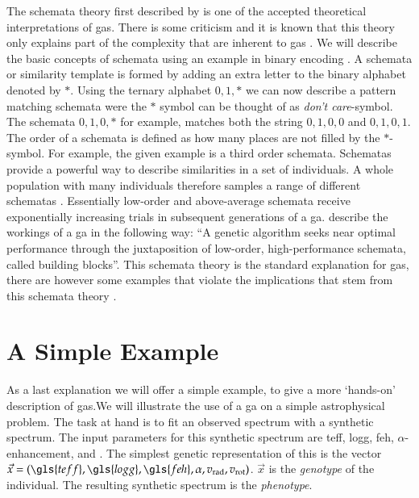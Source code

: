 The schemata theory first described by \cite{holland1975} is one of the accepted theoretical interpretations of \glspl{ga}. There is some criticism and it is known that this theory only explains part of the complexity that are inherent to \glspl{ga} \citep[see ][ and references therein]{Whitley94agenetic}. We will describe the basic concepts of schemata using an example in binary encoding \citep[notation adapted from ][]{citeulike:125978}. A schemata or similarity template is formed by adding an extra letter to the binary alphabet denoted by $*$. Using the ternary alphabet ${0, 1, *}$ we can now describe a pattern matching schemata were the $*$ symbol can be thought of as \textit{don't care}-symbol. The schemata ${0, 1, 0, *}$ for example, matches both the string ${0, 1, 0, 0}$ and ${0, 1, 0, 1}$. The order of a schemata is defined as how many places are not filled by the $*$-symbol. For example, the given example is a third order schemata. Schematas provide a powerful way to describe similarities in a set of \glspl{individual}. 
A whole population with many \glspl{individual} therefore samples a range of different schematas . Essentially low-order and above-average schemata receive exponentially increasing trials in subsequent generations of a \gls{ga}. \citet{Michalewicz:1994:GAD:184675} describe the workings of a \gls{ga} in the following way: ``A genetic algorithm seeks near optimal performance through the juxtaposition of low-order, high-performance schemata, called building blocks''.
This schemata theory is the standard explanation for \glspl{ga}, there are however some examples that violate the implications that stem from this schemata theory \citep[see chapter 3 of][for some examples]{Michalewicz:1994:GAD:184675}.

\section{A Simple Example}

As a last explanation we will offer a simple example, to give a more `hands-on' description of \glspl{ga}.We will illustrate the use of a \gls{ga} on a simple astrophysical problem. The task at hand is to fit an observed spectrum with a synthetic spectrum. The input parameters for this synthetic spectrum are \gls{teff}, \gls{logg}, \gls{feh}, $\alpha$-enhancement, \vrad and \vrot. The simplest genetic representation of this is the vector $\vec{x} = (\gls{teff}, \gls{logg}, \gls{feh}, \alpha, \vrad, \vrot)$. $\vec{x}$ is the \textit{genotype} of the individual. The resulting synthetic spectrum is the \textit{phenotype}. 

